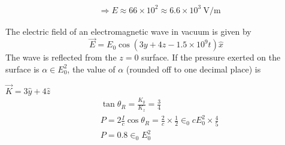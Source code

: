 \begin{enumerate}
\begin{answer}
$$\begin{aligned}
		& \Rightarrow E \approx 66 \times 10^{2} \approx 6.6 \times 10^{3} \mathrm{~V} / \mathrm{m}
		\end{aligned}$$	
	\end{answer}
	\begin{minipage}{\textwidth}
		\item The electric field of an electromagnetic wave in vacuum is given by
		$$
		\vec{E}=E_{0} \cos \left(3 y+4 z-1.5 \times 10^{9} t\right) \hat{x}
		$$
		The wave is reflected from the $z=0$ surface. If the pressure exerted on the surface is $\alpha \in E_{0}^{2}$, the value of $\alpha$ (rounded off to one decimal place) is
	\end{minipage}
	\begin{answer}
		$\vec{K}=3 \hat{y}+4 \hat{z}$
		$$
		\begin{aligned}
		&\tan \theta_{R}=\frac{K_{y}}{K_{z}}=\frac{3}{4} \\
		&P=2 \frac{I}{c} \cos \theta_{R}=\frac{2}{c} \times \frac{1}{2} \in_{0} c E_{0}^{2} \times \frac{4}{5} \\
		&P=0.8 \in_{0} E_{0}^{2}
		\end{aligned}
		$$	
	\end{answer}
\end{enumerate}